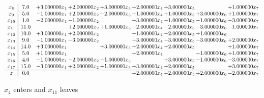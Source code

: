 \documentclass[10pt]{article}
\begin{document}
\[\begin{array}{c| c c@{\hskip 2pt} c@{\hskip 2pt} c@{\hskip 2pt} c@{\hskip 2pt} c@{\hskip 2pt} c@{\hskip 2pt} c@{\hskip 2pt} }
 x_{8}   &  7.0 & + 3.000000 x_{1} & + 2.000000 x_{2} & + 3.000000 x_{3} & + 2.000000 x_{4} & + 3.000000 x_{5} &   & + 1.000000 x_{7}\\
 x_{9}   &  5.0 & -1.000000 x_{1} & + 2.000000 x_{2} & -2.000000 x_{3} & + 1.000000 x_{4} & + 1.000000 x_{5} & + 3.000000 x_{6} & + 1.000000 x_{7}\\
 x_{10}   &  1.0 & -2.000000 x_{1} & -1.000000 x_{2} &   & + 3.000000 x_{4} & -1.000000 x_{5} & -1.000000 x_{6} & -3.000000 x_{7}\\
 x_{11}   &  11.0  &   & + 2.000000 x_{2} & + 1.000000 x_{3} & -2.000000 x_{4} & -2.000000 x_{5} & -3.000000 x_{6} & -1.000000 x_{7}\\
 x_{12}   &  10.0 & + 3.000000 x_{1} & + 2.000000 x_{2} &   & + 1.000000 x_{4} & -2.000000 x_{5} & + 1.000000 x_{6} &   \\
 x_{13}   &  9.0 & -1.000000 x_{1} & -3.000000 x_{2} &   & + 3.000000 x_{4} & -3.000000 x_{5} & -3.000000 x_{6} & + 2.000000 x_{7}\\
 x_{14}   &  14.0 & + 3.000000 x_{1} &   & + 3.000000 x_{3} & + 2.000000 x_{4} & + 2.000000 x_{5} &   & + 1.000000 x_{7}\\
 x_{15}   &  5.0 & + 1.000000 x_{1} &    &   & + 2.000000 x_{4} &   & -1.000000 x_{6} & + 1.000000 x_{7}\\
 x_{16}   &  4.0 & -1.000000 x_{1} & -2.000000 x_{2} & -1.000000 x_{3} &   & + 3.000000 x_{5} & -1.000000 x_{6} & -3.000000 x_{7}\\
 x_{17}   &  15.0 & -3.000000 x_{1} & + 2.000000 x_{2} & + 1.000000 x_{3} & + 3.000000 x_{4} & + 2.000000 x_{5} &   & + 3.000000 x_{7}\\
\hline
z    &  0.0  &    &    &   & + 2.000000 x_{4} & -2.000000 x_{5} & + 2.000000 x_{6} & -2.000000 x_{7}\\
\end{array}\]


 $ x_{4} $ enters and $ x_{11} $ leaves 
\end{document}
